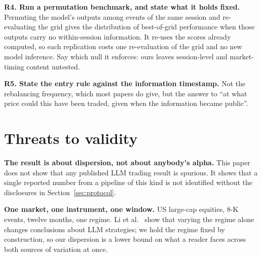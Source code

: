 \documentclass[sigconf]{acmart}
\begin{document}
\textbf{R4. Run a permutation benchmark, and state what it holds fixed.} Permuting the model's
outputs among events of the same session and re-evaluating the grid gives the distribution of
best-of-grid performance when those outputs carry no within-session information. It re-uses the
scores already computed, so each replication costs one re-evaluation of the grid and no new model
inference. Say which null it enforces:
ours leaves session-level and market-timing content untested.

\textbf{R5. State the entry rule against the information timestamp.} Not the rebalancing frequency,
which most papers do give, but the answer to ``at what price could this have been traded, given when
the information became public''.

\section{Threats to validity}
\label{sec:threats}

\textbf{The result is about dispersion, not about anybody's alpha.} This paper does not show that
any published LLM trading result is spurious. It shows that a single reported number from a pipeline
of this kind is not identified without the disclosures in Section~\ref{sec:protocol}.

\textbf{One market, one instrument, one window.} US large-cap equities, 8-K events, twelve months,
one regime. Li et al.~\cite{li2025finsaber} show that varying the regime alone changes conclusions
about LLM strategies; we hold the regime fixed by construction, so our dispersion is a lower bound
on what a reader faces across both sources of variation at once.
\end{document}
